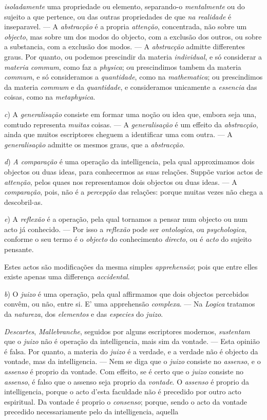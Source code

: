 \emph{isoladamente} uma propriedade ou elemento, separando-o \emph{mentalmente} ou do sujeito a que pertence, ou das outras propriedades de que \emph{na realidade} é inseparavel. --- A \emph{abstracção} é a propria \emph{attenção}, concentrada, não sobre um \emph{objecto}, mas sobre um dos modos do objecto, com a exclusão dos outros, ou sobre a substancia, com a exclusão dos modos. --- A \emph{abstracção} admitte differentes graus. Por quanto, ou podemos prescindir da materia \emph{individual}, e só considerar a \emph{materia commum}, como faz a \emph{physica}; ou prescindimos tambem da materia \emph{commum}, e só consideramos a \emph{quantidade}, como na \emph{mathematica}; ou prescindimos da materia \emph{commum} e da \emph{quantidade}, e consideramos unicamente a \emph{essencia} das coisas, como na \emph{metaphysica}.\par \emph{c}) A \emph{generalisação} consiste em formar uma noção ou idea que, embora seja una, comtudo representa \emph{muitas} coisas. --- A \emph{generalisação} é um effeito da \emph{abstracção}, ainda que muitos escriptores cheguem a identificar uma com outra. --- A \emph{generalisação} admitte os mesmos graus, que a \emph{abstracção}.\par \emph{d}) \emph{A comparação} é uma operação da intelligencia, pela qual approximamos dois objectos ou duas ideas, para conhecermos as suas relações. Suppõe varios actos de \emph{attenção}, pelos quaes nos representamos dois objectos ou duas ideas. --- A \emph{comparação}, pois, não é a \emph{percepção} das relações: porque muitas vezes não chega a descobril-as.\par \emph{e}) A \emph{reflexão} é a operação, pela qual tornamos a pensar num objecto ou num acto já conhecido. --- Por isso a \emph{reflexão} pode ser \emph{ontologica}, ou \emph{psychologica}, conforme o seu termo é o \emph{objecto} do conhecimento \emph{directo}, ou é \emph{acto} do sujeito pensante.\par Estes actos são modificações da mesma simples \emph{apprehensão}; pois que entre elles existe apenas uma differença \emph{accidental}.\par \emph{b}) O \emph{juizo} é uma operação, pela qual affirmamos que dois objectos percebidos convêm, ou não, entre si. E' uma apprehensão \emph{complexa}. --- Na \emph{Logica} tratamos da \emph{natureza}, dos \emph{elementos} e das \emph{especies} do \emph{juizo}.\par \emph{Descartes}, \emph{Mallebranche}, seguidos por alguns escriptores modernos, \emph{sustentam} que o \emph{juizo} não é operação da intelligencia, mais sim da vontade. --- Esta opinião é falsa. Por quanto, a materia do \emph{juizo} é a verdade, e a verdade não é objecto da vontade, mas da intelligencia. --- Nem se diga que o \emph{juizo} consiste no \emph{assenso}, e o \emph{assenso} é proprio da vontade. Com effeito, se é certo que o \emph{juizo} consiste no \emph{assenso}, é falso que o assenso seja proprio da \emph{vontade}. O \emph{assenso} é proprio da intelligencia, porque o acto d'esta faculdade não é precedido por outro acto espiritual. Da vontade é proprio o \emph{consenso}; porque, sendo o acto da vontade precedido necessariamente pelo da intelligencia, aquella 
